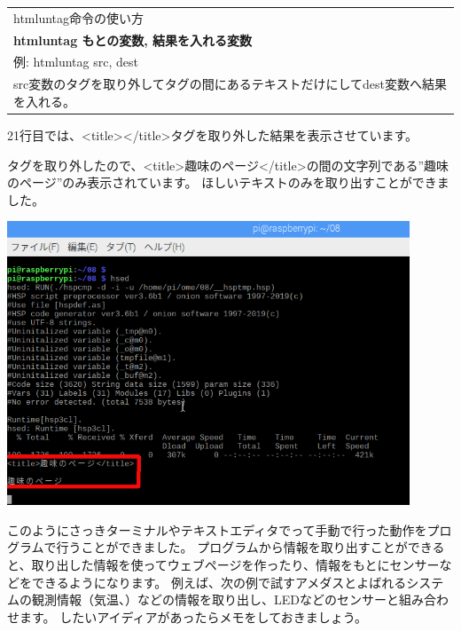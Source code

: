 \begin{table}[htbp]
    \centering
    \begin{tabular}{|l|}
        \hline
        
        htmluntag命令の使い方\\

        {\bfseries htmluntag もとの変数, 結果を入れる変数}\\

        例: htmluntag src, dest\\

        src変数のタグを取り外してタグの間にあるテキストだけにしてdest変数へ結果を入れる。
        \\\hline
    \end{tabular}
\end{table}


\bigskip

21行目では、{\textless}title{\textgreater}{\textless}/title{\textgreater}タグを取り外した結果を表示させています。

タグを取り外したので、{\textless}title{\textgreater}趣味のページ{\textless}/title{\textgreater}の間の文字列である”趣味のページ”のみ表示されています。
ほしいテキストのみを取り出すことができました。



\begin{center}
\includegraphics[width=0.9\textwidth]{./text08-img/textbook-img015.png}

\end{center}

\bigskip


\bigskip

このようにさっきターミナルやテキストエディタでって手動で行った動作をプログラムで行うことができました。
プログラムから情報を取り出すことができると、取り出した情報を使ってウェブページを作ったり、情報をもとにセンサーなどをできるようになります。
例えば、次の例で試すアメダスとよばれるシステムの観測情報（気温、）などの情報を取り出し、LEDなどのセンサーと組み合わせます。
したいアイディアがあったらメモをしておきましょう。

